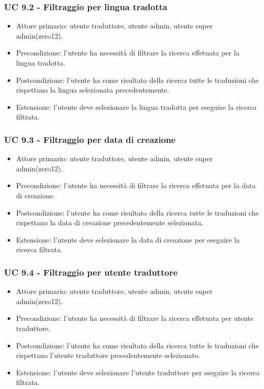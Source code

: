     \subsubsection{UC 9.2 - Filtraggio per lingua tradotta}
        \begin{itemize}
            \item Attore primario: utente traduttore, utente admin, utente super admin(zero12).
            \item Precondizione: l'utente ha necessità di filtrare la ricerca effetuata per la lingua tradotta.
            \item Postcondizione: l'utente ha come risultato della ricerca tutte le traduzioni che rispettano la lingua selezionata precedentemente. 
            \item Estensione: l'utente deve selezionare la lingua tradotta per eseguire la ricerca filtrata.
        \end{itemize}        
    \subsubsection{UC 9.3 - Filtraggio per data di creazione}
        \begin{itemize}
            \item Attore primario: utente traduttore, utente admin, utente super admin(zero12).
            \item Precondizione: l'utente ha necessità di filtrare la ricerca effetuata per la data di creazione.
            \item Postcondizione: l'utente ha come risultato della ricerca tutte le traduzioni che rispettano la data di creazione precedentemente selezionata. 
            \item Estensione: l'utente deve selezionare la data di creazione per eseguire la ricerca filtrata.
        \end{itemize}       
    \subsubsection{UC 9.4 - Filtraggio per utente traduttore}
        \begin{itemize}
            \item Attore primario: utente traduttore, utente admin, utente super admin(zero12).
            \item Precondizione: l'utente ha necessità di filtrare la ricerca effetuata per utente traduttore.
            \item Postcondizione: l'utente ha come risultato della ricerca tutte le traduzioni che rispettano l'utente traduttore precedentemente selezionato. 
            \item Estensione: l'utente deve selezionare l'utente traduttore per eseguire la ricerca filtrata.
        \end{itemize}  
